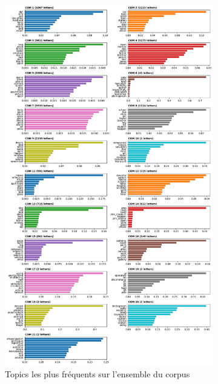 \documentclass[12pt,a4paper,oneside,titlepage]{book} %
\begin{document}
	\begin{figure}[htbp]
	\centering
	\begin{subfigure}{0.45\textwidth}
		\includegraphics[width=\textwidth]{illustration/topic_corpus.png}
		\caption{Topics les plus fréquents sur l'ensemble du corpus}
		\label{fig:topic_corpus}
	\end{subfigure}
	\hfill
	\begin{subfigure}{0.45\textwidth}

\end{subfigure}
\end{figure}
\end{document}

